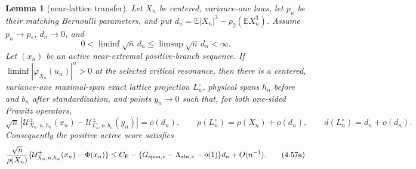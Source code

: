 \documentclass[11pt,a4paper]{article}
\numberwithin{equation}{section}
\newtheorem{lemma}[theorem]{Lemma}
\theoremstyle{definition}
\theoremstyle{remark}
\newcommand{\E}{\mathbb E}
\newcommand{\CE}{C_{\mathrm E}}
\begin{document}
\begin{lemma}[near-lattice transfer]\label{orig:lem:latticetransfer}
Let $X_n$ be centered, variance-one laws, let $p_n$ be their matching
Bernoulli parameters, and put
$d_n=\E|X_n|^3-\rho_2(\E X_n^3)$.  Assume $p_n\to p_*$, $d_n\to0$, and
\[
                 0<\liminf\sqrt n\,d_n
                 \le\limsup\sqrt n\,d_n<\infty.       \tag{4.56}
\]
Let \((x_n)\) be an active near-extremal positive-branch sequence.  If
$\liminf|\varphi_{X_n}(u_n)|^n>0$ at the selected critical resonance,
then there is a centered,
variance-one maximal-span exact lattice projection $L_n^\circ$, physical
spans $h_n$ before and $b_n$ after standardization, and points $y_n\to0$
such that, for both one-sided Prawitz
operators,
\[
 \sqrt n\,|\mathcal U^\pm_{X_n,n,h_n}(x_n)
       -\mathcal U^\pm_{L_n^\circ,n,b_n}(y_n)|=o(d_n),
 \qquad \rho(L_n^\circ)=\rho(X_n)+o(d_n),
 \qquad d(L_n^\circ)=d_n+o(d_n).                       \tag{4.57}
\]
Consequently the positive active score satisfies
\[
 {\sqrt n\over\rho(X_n)}
 \{\mathcal U^+_{X_n,n,h_n}(x_n)-\Phi(x_n)\}
 \le\CE-\{G_{\rm span,*}-\Lambda_{\rm abs,*}-o(1)\}d_n
               +O(n^{-1}).                            \tag{4.57a}
\]
\end{lemma}
\end{document}
